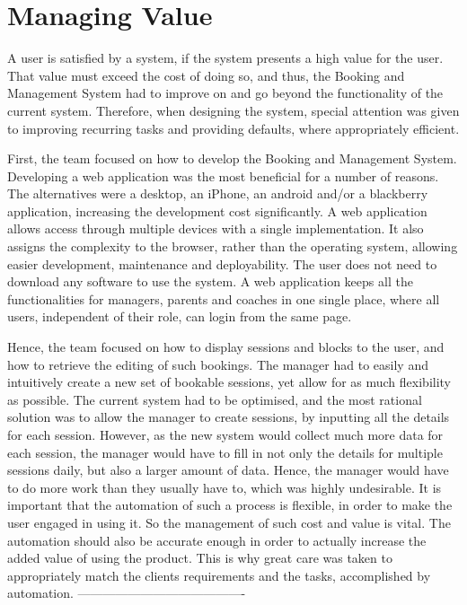 \documentclass{l3proj}
\begin{document}
\section{Managing Value}
\par
A user is satisfied by a system, if the system presents a high value for the user. That value must exceed the cost of doing so, and thus, the Booking and Management System had  to improve on and go beyond the functionality of the current system. Therefore, when designing the system, special attention was given to improving recurring tasks and providing defaults, where appropriately efficient.
\par First, the team focused on how to develop the Booking and Management System. Developing a web application was the most beneficial for a number of reasons. The alternatives were a desktop, an iPhone, an android and/or a blackberry application, increasing the development cost significantly. A web application allows access through multiple devices with a single implementation. It also assigns the complexity to the browser, rather than the operating system, allowing easier development, maintenance and deployability. The user does not need to download any software to use the system. A web application keeps all the functionalities for managers, parents and coaches in one single place, where all users, independent of their role, can login from the same page.
\par Hence, the team focused on how to display sessions and blocks to the user, and how to retrieve the editing of such bookings. The manager had to easily and intuitively create a new set of bookable sessions, yet allow for as much flexibility as possible. The current system had to be optimised, and the most rational solution was to allow the manager to create sessions, by inputting all the details for each session. However, as the new system would collect much more data for each session, the manager would have to fill in not only the details for multiple sessions daily, but also a larger amount of data. Hence, the manager would have to do more work than they usually have to, which was highly undesirable. It is important that the automation of such a process is flexible, in order to make the user engaged in using it. So the management of such cost and value is vital. The automation should also be accurate enough in order to actually increase the added value of using the product. This is why great care was taken to appropriately match the clients requirements and the tasks, accomplished by automation.
----------------------------------------
\end{document}
